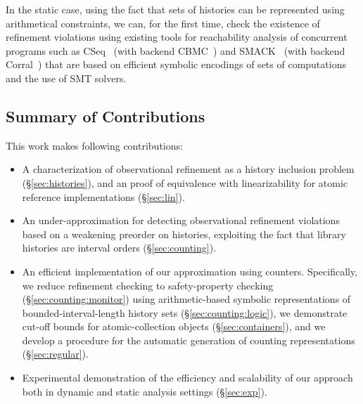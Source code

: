 In the static case, using the fact that sets of histories can be represented
using arithmetical constraints, we can, for the first time, check the existence
of refinement violations using existing tools for reachability analysis of
concurrent programs such as CSeq~\cite{conf/ase/FischerIP13} (with backend
CBMC~\cite{conf/tacas/KroeningT14}) and SMACK~\cite{conf/cav/RakamaricE14}
(with backend Corral~\cite{conf/cav/LalQL12}) that are based on efficient
symbolic encodings of sets of computations and the use of SMT solvers.

\subsection{Summary of Contributions}

This work makes following contributions:
\begin{itemize}

  \item A characterization of observational refinement as a history inclusion
  problem (\S\ref{sec:histories}), and an proof of equivalence with
  linearizability for atomic reference implementations (\S\ref{sec:lin}).

  \item An under-approximation for detecting observational refinement
  violations based on a weakening preorder on histories, exploiting the fact
  that library histories are interval orders (\S\ref{sec:counting}).

  \item An efficient implementation of our approximation using counters.
  Specifically, we reduce refinement checking to safety-property checking
  (\S\ref{sec:counting:monitor}) using arithmetic-based symbolic
  representations of bounded-interval-length history sets
  (\S\ref{sec:counting:logic}), we demonstrate cut-off bounds for
  atomic-collection objects (\S\ref{sec:containers}), and we develop a
  procedure for the automatic generation of counting representations
  (\S\ref{sec:regular}).

  \item Experimental demonstration of the efficiency and scalability of our
  approach both in dynamic and static analysis settings (\S\ref{sec:exp}).

\end{itemize}
